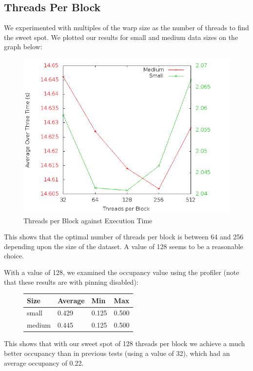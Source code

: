 \subsection*{Threads Per Block}
We experimented with multiples of the warp size as the number of threads to find the sweet spot. We plotted our results for small and medium data sizes on the graph below:

\begin{figure}[H]
  \centering
  \includegraphics[scale=0.3]{images/threadsperblock}
  \caption[threadsperblock]{Threads per Block against Execution Time}
  \label{fig:threadsperblock}
\end{figure}

This shows that the optimal number of threads per block is between 64 and 256 depending upon the size of the dataset. A value of 128 seems to be a reasonable choice.

With a value of 128, we examined the occupancy value using the profiler (note that these results are with pinning disabled):

\begin{figure}[H]\centering \begin{tabular}{ l | l | l | l}
\hline
Size & Average & Min & Max \\
\hline
\hline
small & 0.429 & 0.125 & 0.500 \\
medium & 0.445 & 0.125 & 0.500 \\
\hline
\end{tabular} \end{figure}

This shows that with our sweet spot of 128 threads per block we achieve a much better occupancy than in previous tests (using a value of 32), which had an average occupancy of 0.22.